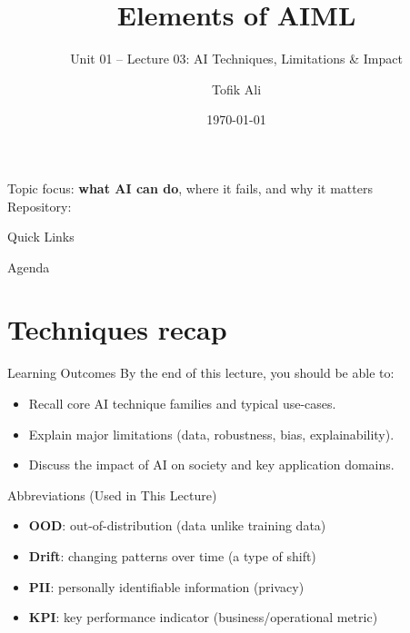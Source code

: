 \documentclass[aspectratio=169]{beamer}
\title[Elements of AIML]{Elements of AIML}
\subtitle{Unit 01 -- Lecture 03: AI Techniques, Limitations \& Impact}
\author{Tofik Ali}
\institute{School of Computer Science, UPES Dehradun}
\date{\today}
\begin{document}
\UPESCoverFrame
\setcounter{framenumber}{0}

\begin{frame}
  \titlepage
  \vspace{0.3em}
  \begin{center}
    \footnotesize Topic focus: \textbf{what AI can do}, where it fails, and why it matters\\[0.25em]
    \footnotesize Repository: \texttt{\AIMLRepoURL}
  \end{center}
  \slidesources{\AIMLUnitISources}
\end{frame}

\begin{frame}{Quick Links}
  \centering
  \hyperlink{sec:tech}{}\hspace{0.6em}
  \hyperlink{sec:limits}{}\hspace{0.6em}
  \hyperlink{sec:impact}{}\hspace{0.6em}
  \hyperlink{sec:case}{}\hspace{0.6em}
  \hyperlink{sec:summary}{}
\end{frame}

\begin{frame}{Agenda}
  \tableofcontents
\end{frame}

\section{Techniques recap}
\label{sec:tech}

\begin{frame}{Learning Outcomes}
  By the end of this lecture, you should be able to:
  \begin{itemize}[<+->]
    \item Recall core AI technique families and typical use-cases.
    \item Explain major limitations (data, robustness, bias, explainability).
    \item Discuss the impact of AI on society and key application domains.
  \end{itemize}
\end{frame}

\begin{frame}{Abbreviations (Used in This Lecture)}
  \begin{itemize}[<+->]
    \item \textbf{OOD}: out-of-distribution (data unlike training data)
    \item \textbf{Drift}: changing patterns over time (a type of shift)
    \item \textbf{PII}: personally identifiable information (privacy)
    \item \textbf{KPI}: key performance indicator (business/operational metric)
  \end{itemize}
\end{frame}
\end{document}
